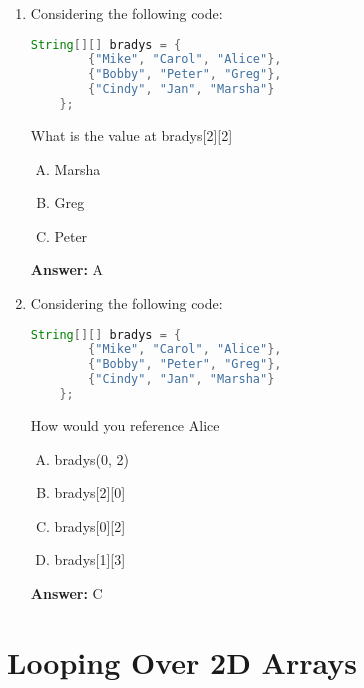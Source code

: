 \documentclass[12pt]{article}
\begin{document}
\bigskip

\begin{enumerate}[1.]
    \item

    Considering the following code:

    \begin{lstlisting}[language=Java]
    String[][] bradys = {
        {"Mike", "Carol", "Alice"},
        {"Bobby", "Peter", "Greg"},
        {"Cindy", "Jan", "Marsha"}
    };
    \end{lstlisting}

    What is the value at bradys[2][2]

    \begin{enumerate}[A.]
        \item Marsha
        \item Greg
        \item Peter
    \end{enumerate}

    \bigskip

    \textbf{Answer:} A

    \item

    Considering the following code:

    \begin{lstlisting}[language=Java]
    String[][] bradys = {
        {"Mike", "Carol", "Alice"},
        {"Bobby", "Peter", "Greg"},
        {"Cindy", "Jan", "Marsha"}
    };
    \end{lstlisting}

    How would you reference Alice

    \bigskip

    \begin{enumerate}[A.]
        \item bradys(0, 2)
        \item bradys[2][0]
        \item bradys[0][2]
        \item bradys[1][3]
    \end{enumerate}

    \bigskip

    \textbf{Answer:} C

\end{enumerate}

\bigskip

\section{Looping Over 2D Arrays}
\end{document}
